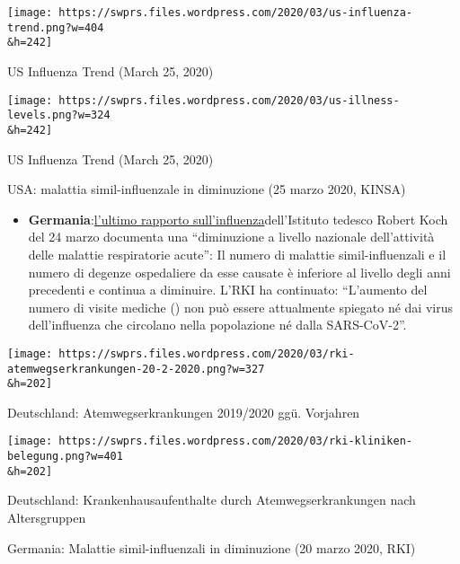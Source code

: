 \href{https://swprs.org/covid-19-hinweis-ii/us-influenza-trend/}{}

\texttt{[image: https://swprs.files.wordpress.com/2020/03/us-influenza-trend.png?w=404\\\&h=242]}

US Influenza Trend (March 25, 2020)

\href{https://swprs.org/covid-19-hinweis-ii/us-illness-levels/}{}

\texttt{[image: https://swprs.files.wordpress.com/2020/03/us-illness-levels.png?w=324\\\&h=242]}

US Influenza Trend (March 25, 2020)

USA: malattia simil-influenzale in diminuzione (25 marzo 2020, KINSA)

\begin{itemize}
\tightlist
\item
  \textbf{Germania}:\href{https://influenza.rki.de/Wochenberichte/2019_2020/2020-12.pdf}{l'ultimo
  rapporto sull'influenza}dell'Istituto tedesco Robert Koch del 24 marzo
  documenta una ``diminuzione a livello nazionale dell'attività delle
  malattie respiratorie acute'': Il numero di malattie simil-influenzali
  e il numero di degenze ospedaliere da esse causate è inferiore al
  livello degli anni precedenti e continua a diminuire. L'RKI ha
  continuato: ``L'aumento del numero di visite mediche () non può essere
  attualmente spiegato né dai virus dell'influenza che circolano nella
  popolazione né dalla SARS-CoV-2''.
\end{itemize}

\href{https://swprs.org/covid-19-hinweis-ii/rki-atemwegserkrankungen-20-2-2020/}{}

\texttt{[image: https://swprs.files.wordpress.com/2020/03/rki-atemwegserkrankungen-20-2-2020.png?w=327\\\&h=202]}

Deutschland: Atemwegserkrankungen 2019/2020 ggü. Vorjahren

\href{https://swprs.org/covid-19-hinweis-ii/rki-kliniken-belegung/}{}

\texttt{[image: https://swprs.files.wordpress.com/2020/03/rki-kliniken-belegung.png?w=401\\\&h=202]}

Deutschland: Krankenhausaufenthalte durch Atemwegserkrankungen nach
Altersgruppen

Germania: Malattie simil-influenzali in diminuzione (20 marzo 2020, RKI)

